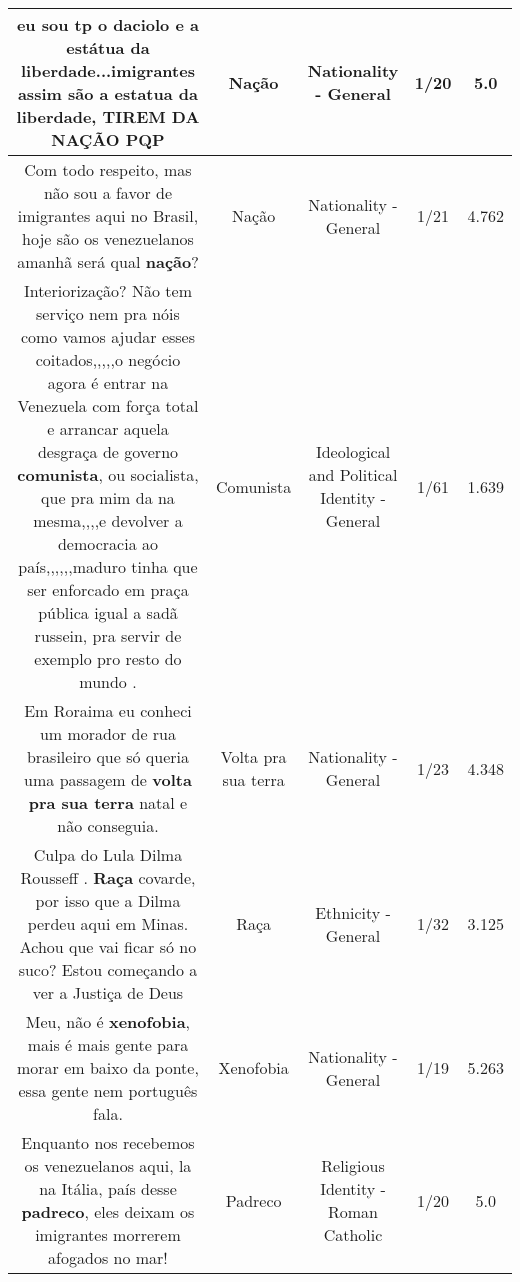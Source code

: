 \documentclass[11pt]{article}
\newlength\mylength
\begin{document}
\begin{center}
\begin{longtable}{|C{.65\mylength}|C{.30\mylength}|C{.12\mylength}|C{.12\mylength}|C{.12\mylength}|}
  \small eu sou tp o daciolo e a estátua da liberdade...imigrantes assim são a estatua da liberdade, TIREM DA \textbf{NAÇÃO} PQP\normalsize   & Nação & Nationality - General & 1/20 & 5.0 \\  \hline
  \small Com todo respeito, mas não sou a favor de imigrantes aqui no Brasil, hoje são os venezuelanos amanhã será qual \textbf{nação}?\normalsize   & Nação & Nationality - General & 1/21 & 4.762 \\  \hline
  \small Interiorização? Não tem serviço nem pra nóis como vamos ajudar esses coitados,,,,,o negócio agora é entrar na Venezuela com força total e arrancar aquela desgraça de governo \textbf{comunista}, ou socialista, que pra mim da na mesma,,,,e devolver a democracia ao país,,,,,,maduro tinha que ser enforcado em praça pública igual a sadã russein, pra servir de exemplo pro resto do mundo .\normalsize   & Comunista & Ideological and Political Identity - General & 1/61 & 1.639 \\  \hline
  \small Em Roraima eu conheci um morador de rua brasileiro que só queria uma passagem de \textbf{volta pra sua terra} natal e não conseguia.\normalsize   & Volta pra sua terra & Nationality - General & 1/23 & 4.348 \\  \hline
  \small Culpa do Lula Dilma Rousseff . \textbf{Raça} covarde, por isso que a Dilma perdeu aqui em Minas. Achou que vai ficar só no suco? Estou começando a ver a Justiça de Deus\normalsize   & Raça & Ethnicity - General & 1/32 & 3.125 \\  \hline
  \small Meu, não é \textbf{xenofobia}, mais é mais gente para morar em baixo da ponte, essa gente nem português fala.\normalsize   & Xenofobia & Nationality - General & 1/19 & 5.263 \\  \hline
  \small Enquanto nos recebemos os venezuelanos aqui, la na Itália, país desse \textbf{padreco}, eles deixam os imigrantes morrerem afogados no mar!\normalsize   & Padreco & Religious Identity - Roman Catholic & 1/20 & 5.0 \\  \hline

\end{longtable}
\end{center}
\end{document}
